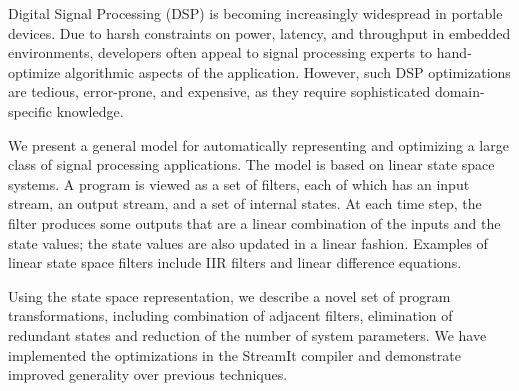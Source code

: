 Digital Signal Processing (DSP) is becoming increasingly wide\-spread
in portable devices. Due to harsh constraints on power, latency, and
throughput in embedded environments, developers often appeal to signal
processing experts to hand-optimize algorithmic aspects of the
application.  However, such DSP optimizations are tedious,
error-prone, and expensive, as they require sophisticated
domain-specific knowledge.

We present a general model for automatically representing and
optimizing a large class of signal processing applications. The model
is based on linear state space systems. A program is viewed as a set
of filters, each of which has an input stream, an output stream, and a
set of internal states. At each time step, the filter produces some
outputs that are a linear combination of the inputs and the state
values; the state values are also updated in a linear
fashion. Examples of linear state space filters include IIR filters
and linear difference equations.

Using the state space representation, we describe a novel set of
program transformations, including combination of adjacent filters,
elimination of redundant states and reduction of the number of system
parameters. We have implemented the optimizations in the StreamIt
compiler and demonstrate improved generality over previous techniques.
